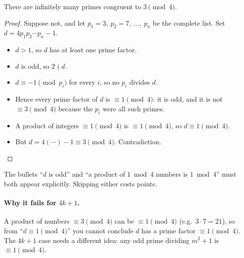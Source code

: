 \documentclass[11pt]{article}
\begin{document}
\begin{claim}
There are infinitely many primes congruent to $3 \pmod 4$.
\end{claim}
\begin{proof}
Suppose not, and let $p_1 = 3,\ p_2 = 7,\ \dots,\ p_n$ be the complete list. Set $d = 4p_1 p_2 \cdots p_n - 1$.
\begin{itemize}
  \item $d > 1$, so $d$ has at least one prime factor.
  \item $d$ is odd, so $2 \nmid d$.
  \item $d \equiv -1 \pmod{p_i}$ for every $i$, so no $p_i$ divides $d$.
  \item Hence every prime factor of $d$ is $\equiv 1 \pmod 4$: it is odd, and it is not $\equiv 3 \pmod 4$ because the $p_i$ were all such primes.
  \item A product of integers $\equiv 1 \pmod 4$ is $\equiv 1 \pmod 4$, so $d \equiv 1 \pmod 4$.
  \item But $d = 4(\cdots) - 1 \equiv 3 \pmod 4$. Contradiction.\qedhere
\end{itemize}
\end{proof}

\begin{gradingnote}\leavevmode
The bullets ``$d$ is odd'' and ``a product of $1 \bmod 4$ numbers is $1 \bmod 4$'' must both appear explicitly. Skipping either costs points.
\end{gradingnote}

\paragraph{Why it fails for $4k+1$.} A product of numbers $\equiv 3 \pmod 4$ can be $\equiv 1 \pmod 4$ (e.g.\ $3 \cdot 7 = 21$), so from ``$d \equiv 1 \pmod 4$'' you cannot conclude $d$ has a prime factor $\equiv 1 \pmod 4$. The $4k+1$ case needs a different idea: any odd prime dividing $m^2 + 1$ is $\equiv 1 \pmod 4$.
\end{document}
